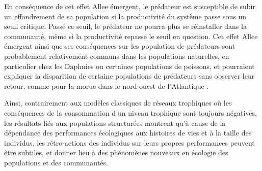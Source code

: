 En conséquence de cet effet Allee émergent, le prédateur est susceptible de
subir un effondrement de sa population si la productivité du système passe sous
un seuil critique. Passé ce seuil, le prédateur ne pourra plus se réinstaller
dans la communauté, même si la productivité repasse le seuil en question. 
Cet effet Allee émergent ainsi que ses conséquences sur les population de
prédateurs sont probablement relativement communs dans les populations
naturelles, en particulier chez les Daphnies \autocites{mccauley1987a} ou certaines
populations de poissons, et pourraient expliquer la disparition de certaine
populations de prédateurs sans observer leur retour, comme pour la morue dans le
nord-ouest de l'Atlantique \autocites{carscadden2001a}.

Ainsi, contrairement aux modèles classiques de réseaux  trophiques où les
conséquences de la consommation d'un niveau trophique sont toujours négatives,
les résultats liés aux populations structurées montrent qu'à cause de la
dépendance des performances écologiques aux histoires de vies et à la taille des
individus, les rétro-actions des individus sur leurs propres performances
peuvent être subtiles, et donner lieu à des phénomènes nouveaux en écologie des
populations et des communautés. 

